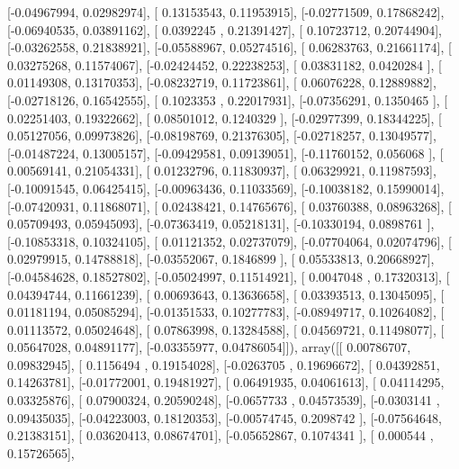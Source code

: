 \documentclass{article}
\begin{document}
       [-0.04967994,  0.02982974],
       [ 0.13153543,  0.11953915],
       [-0.02771509,  0.17868242],
       [-0.06940535,  0.03891162],
       [ 0.0392245 ,  0.21391427],
       [ 0.10723712,  0.20744904],
       [-0.03262558,  0.21838921],
       [-0.05588967,  0.05274516],
       [ 0.06283763,  0.21661174],
       [ 0.03275268,  0.11574067],
       [-0.02424452,  0.22238253],
       [ 0.03831182,  0.0420284 ],
       [ 0.01149308,  0.13170353],
       [-0.08232719,  0.11723861],
       [ 0.06076228,  0.12889882],
       [-0.02718126,  0.16542555],
       [ 0.1023353 ,  0.22017931],
       [-0.07356291,  0.1350465 ],
       [ 0.02251403,  0.19322662],
       [ 0.08501012,  0.1240329 ],
       [-0.02977399,  0.18344225],
       [ 0.05127056,  0.09973826],
       [-0.08198769,  0.21376305],
       [-0.02718257,  0.13049577],
       [-0.01487224,  0.13005157],
       [-0.09429581,  0.09139051],
       [-0.11760152,  0.056068  ],
       [ 0.00569141,  0.21054331],
       [ 0.01232796,  0.11830937],
       [ 0.06329921,  0.11987593],
       [-0.10091545,  0.06425415],
       [-0.00963436,  0.11033569],
       [-0.10038182,  0.15990014],
       [-0.07420931,  0.11868071],
       [ 0.02438421,  0.14765676],
       [ 0.03760388,  0.08963268],
       [ 0.05709493,  0.05945093],
       [-0.07363419,  0.05218131],
       [-0.10330194,  0.0898761 ],
       [-0.10853318,  0.10324105],
       [ 0.01121352,  0.02737079],
       [-0.07704064,  0.02074796],
       [ 0.02979915,  0.14788818],
       [-0.03552067,  0.1846899 ],
       [ 0.05533813,  0.20668927],
       [-0.04584628,  0.18527802],
       [-0.05024997,  0.11514921],
       [ 0.0047048 ,  0.17320313],
       [ 0.04394744,  0.11661239],
       [ 0.00693643,  0.13636658],
       [ 0.03393513,  0.13045095],
       [ 0.01181194,  0.05085294],
       [-0.01351533,  0.10277783],
       [-0.08949717,  0.10264082],
       [ 0.01113572,  0.05024648],
       [ 0.07863998,  0.13284588],
       [ 0.04569721,  0.11498077],
       [ 0.05647028,  0.04891177],
       [-0.03355977,  0.04786054]]), array([[ 0.00786707,  0.09832945],
       [ 0.1156494 ,  0.19154028],
       [-0.0263705 ,  0.19696672],
       [ 0.04392851,  0.14263781],
       [-0.01772001,  0.19481927],
       [ 0.06491935,  0.04061613],
       [ 0.04114295,  0.03325876],
       [ 0.07900324,  0.20590248],
       [-0.0657733 ,  0.04573539],
       [-0.0303141 ,  0.09435035],
       [-0.04223003,  0.18120353],
       [-0.00574745,  0.2098742 ],
       [-0.07564648,  0.21383151],
       [ 0.03620413,  0.08674701],
       [-0.05652867,  0.1074341 ],
       [ 0.000544  ,  0.15726565],
\end{document}
